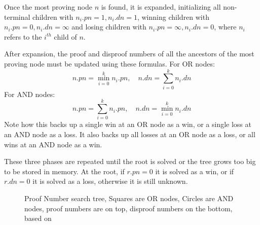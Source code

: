 Once the most proving node $n$ is found, it is expanded, initializing all non-terminal children with $n_i.pn = 1, n_i.dn = 1$, winning children with $n_i.pn = 0, n_i.dn = \infty$ and losing children with $n_i.pn = \infty, n_i.dn = 0 $, where $n_i$ refers to the $i^{th}$ child of $n$.

After expansion, the proof and disproof numbers of all the ancestors of the most proving node must be updated using these formulas. For OR nodes: $$ n.pn = \displaystyle\min\limits_{i=0}^k n_i.pn,\quad n.dn = \displaystyle\sum\limits_{i=0}^k n_i.dn $$ For AND nodes: $$ n.pn = \displaystyle\sum\limits_{i=0}^k n_i.pn, \quad n.dn = \displaystyle\min\limits_{i=0}^k n_i.dn $$ Note how this backs up a single win at an OR node as a win, or a single loss at an AND node as a loss. It also backs up all losses at an OR node as a loss, or all wins at an AND node as a win. %

These three phases are repeated until the root is solved or the tree grows too big to be stored in memory. At the root, if $r.pn = 0$ it is solved as a win, or if $r.dn = 0$ it is solved as a loss, otherwise it is still unknown.

\begin{figure}
\centering
{}
\caption{Proof Number search tree, Squares are OR nodes, Circles are AND nodes, proof numbers are on top, disproof numbers on the bottom, based on \cite{winands2003-PDS-PN}}
\label{fig:pntree}
\end{figure}

